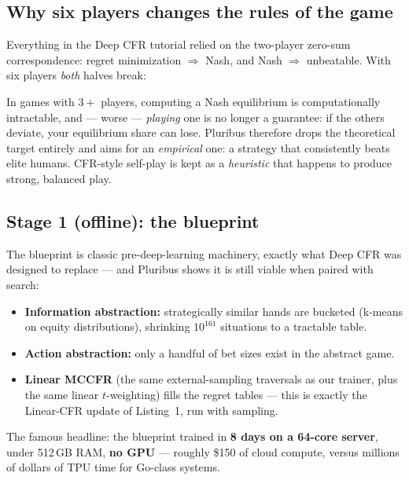 \documentclass[11pt,a4paper]{article}
\begin{document}
\subsection{Why six players changes the rules of the game}

Everything in the Deep CFR tutorial relied on the two-player zero-sum
correspondence: regret minimization $\Rightarrow$ Nash, and Nash
$\Rightarrow$ unbeatable. With six players \emph{both} halves break:

\begin{defbox}
In games with $3+$ players, computing a Nash equilibrium is computationally
intractable, and --- worse --- \emph{playing} one is no longer a guarantee:
if the others deviate, your equilibrium share can lose. Pluribus therefore
drops the theoretical target entirely and aims for an \emph{empirical} one:
a strategy that consistently beats elite humans. CFR-style self-play is kept
as a \emph{heuristic} that happens to produce strong, balanced play.
\end{defbox}

\subsection{Stage 1 (offline): the blueprint}

The blueprint is classic pre-deep-learning machinery, exactly what Deep CFR
was designed to replace --- and Pluribus shows it is still viable when paired
with search:

\begin{itemize}[leftmargin=1.4em, itemsep=2pt]
\item \textbf{Information abstraction:} strategically similar hands are
  bucketed (k-means on equity distributions), shrinking $10^{161}$ situations
  to a tractable table.
\item \textbf{Action abstraction:} only a handful of bet sizes exist in the
  abstract game.
\item \textbf{Linear MCCFR} (the same external-sampling traversals as our
  trainer, plus the same linear $t$-weighting) fills the regret tables ---
  this is exactly the Linear-CFR update of Listing~1, run with sampling.
\end{itemize}

The famous headline: the blueprint trained in \textbf{8 days on a 64-core
server}, under 512\,GB RAM, \textbf{no GPU} --- roughly \$150 of cloud compute,
versus millions of dollars of TPU time for Go-class systems.
\end{document}
